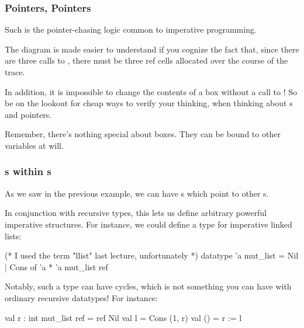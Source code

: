 \documentclass[aspectratio=169, handout]{beamer}
\begin{document}
\begin{frame}[fragile]
  \frametitle{Pointers, Pointers}

  Such is the pointer-chasing logic common to imperative programming.

  \pause
  \vspace{\fill}

  The diagram is made easier to understand if you cognize the fact that, since
  there are three calls to , there must be three ref cells allocated
  over the course of the trace.

  \pause
  \vspace{\fill}

  In addition, it is impossible to change the contents of a box without a
  call to \code{:=}! So be on the lookout for cheap ways to verify your
  thinking, when thinking about s and pointers.

  \pause
  \vspace{\fill}

  Remember, there's nothing special about boxes. They can be bound to other
  variables at will.

  \vspace{\fill}

\end{frame}

\begin{frame}[fragile]
  \frametitle{s within s}

  As we saw in the previous example, we can have s which point
  to other s.

  \pause
  \vspace{\fill}

  In conjunction with recursive types, this lets us define arbitrary powerful
  imperative structures. For instance, we could define a type for imperative
  linked lists:

  \pause
  \vspace{\fill}

  \begin{codeblock}
    (* I used the term "llist" last lecture, unfortunately *)
    datatype 'a mut_list = Nil | Cons of 'a * 'a mut_list ref
  \end{codeblock}

  \pause
  \vspace{\fill}

  Notably, such a type can have cycles, which is not something you can have
  with ordinary recursive datatypes! For instance:

  \begin{codeblock}
    val r : int mut_list ref = ref Nil
    val l = Cons (1, r)
    val () = r := l
  \end{codeblock}
\end{frame}
\end{document}
